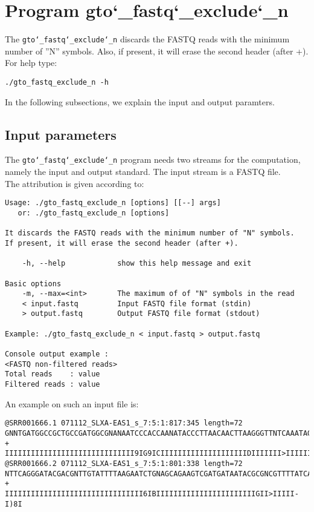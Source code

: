 \section{Program gto\char`_fastq\char`_exclude\char`_n}
The \texttt{gto\char`_fastq\char`_exclude\char`_n} discards the FASTQ reads with the minimum number of ''N'' symbols. Also, if present, it will erase the second header (after +).\\
For help type:
\begin{lstlisting}
./gto_fastq_exclude_n -h
\end{lstlisting}
In the following subsections, we explain the input and output paramters.

\subsection*{Input parameters}

The \texttt{gto\char`_fastq\char`_exclude\char`_n} program needs two streams for the computation, namely the input and output standard. The input stream is a FASTQ file.\\
The attribution is given according to:
\begin{lstlisting}
Usage: ./gto_fastq_exclude_n [options] [[--] args]
   or: ./gto_fastq_exclude_n [options]

It discards the FASTQ reads with the minimum number of "N" symbols. 
If present, it will erase the second header (after +).

    -h, --help            show this help message and exit

Basic options
    -m, --max=<int>       The maximum of of "N" symbols in the read
    < input.fastq         Input FASTQ file format (stdin)
    > output.fastq        Output FASTQ file format (stdout)

Example: ./gto_fastq_exclude_n < input.fastq > output.fastq

Console output example :
<FASTQ non-filtered reads>
Total reads    : value
Filtered reads : value
\end{lstlisting}
An example on such an input file is:
\begin{lstlisting}
@SRR001666.1 071112_SLXA-EAS1_s_7:5:1:817:345 length=72
GNNTGATGGCCGCTGCCGATGGCGNANAATCCCACCAANATACCCTTAACAACTTAAGGGTTNTCAAATAGA
+
IIIIIIIIIIIIIIIIIIIIIIIIIIIIII9IG9ICIIIIIIIIIIIIIIIIIIIIDIIIIIII>IIIIII/
@SRR001666.2 071112_SLXA-EAS1_s_7:5:1:801:338 length=72
NTTCAGGGATACGACGNTTGTATTTTAAGAATCTGNAGCAGAAGTCGATGATAATACGCGNCGTTTTATCAN
+
IIIIIIIIIIIIIIIIIIIIIIIIIIIIIIII6IBIIIIIIIIIIIIIIIIIIIIIIIGII>IIIII-I)8I
\end{lstlisting}

